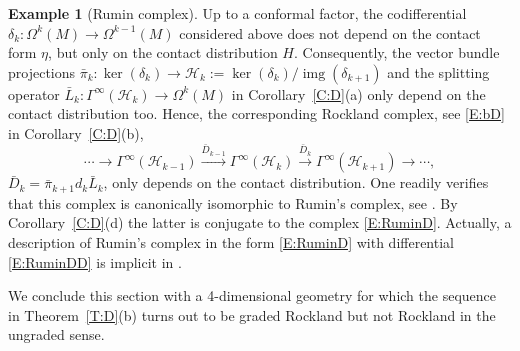 \documentclass[reqno,12pt]{amsart}
\DeclareMathOperator{\img}{img}
\theoremstyle{plain}
\theoremstyle{definition}
\newtheorem{example}[theorem]{Example}
\begin{document}
\begin{example}[Rumin complex]
Up to a conformal factor, the codifferential $\delta_k\colon\Omega^k(M)\to\Omega^{k-1}(M)$ considered above does not depend on the contact form $\eta$, but only on the contact distribution $H$. 
Consequently, the vector bundle projections $\bar\pi_k\colon\ker(\delta_k)\to\mathcal H_k:=\ker(\delta_k)/\img(\delta_{k+1})$ and the splitting operator $\bar L_k\colon\Gamma^\infty(\mathcal H_k)\to\Omega^k(M)$ in Corollary~\ref{C:D}(a) only depend on the contact distribution too.
Hence, the corresponding Rockland complex, see \eqref{E:bD} in Corollary~\ref{C:D}(b),
$$
\cdots\to\Gamma^\infty(\mathcal H_{k-1})\xrightarrow{\bar D_{k-1}}\Gamma^\infty(\mathcal H_k)\xrightarrow{\bar D_k}\Gamma^\infty(\mathcal H_{k+1})\to\cdots,
$$
$\bar D_k=\bar\pi_{k+1}d_k\bar L_k$, only depends on the contact distribution.
One readily verifies that this complex is canonically isomorphic to Rumin's complex, see \cite{R00}.
By Corollary~\ref{C:D}(d) the latter is conjugate to the complex \eqref{E:RuminD}.
Actually, a description of Rumin's complex in the form \eqref{E:RuminD} with differential \eqref{E:RuminDD} is implicit in \cite[Section~3]{R00}.
\end{example}


We conclude this section with a 4-dimensional geometry for which the sequence in Theorem~\ref{T:D}(b) turns out to be graded Rockland but not Rockland in the ungraded sense.
\end{document}
